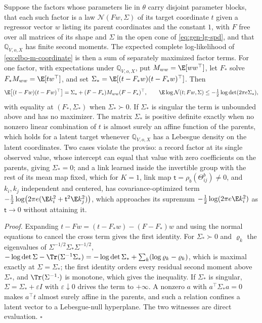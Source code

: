 Suppose the factors whose parameters lie in \(\theta\) carry disjoint
parameter blocks, that each such factor is a law \(\mathcal N(Fw,\Sigma)\) of
its target coordinate \(t\) given a regressor vector \(w\) listing its parent
coordinates and the constant \(1\), with \(F\) free over all matrices of its
shape and \(\Sigma\) in the open cone of \eqref{eq:gen-lg-spd}, and that
\(\mathbb Q_{V,o,X}\) has finite second moments. The expected complete
log-likelihood of \eqref{eq:elbo-m-coordinate} is then a sum of separately
maximized factor terms. For one factor, with expectations under
\(\mathbb Q_{V,o,X}\), put \(M_{ww}=\E[ww^\top]\), let \(F_*\) solve
\(F_*M_{ww}=\E[tw^\top]\), and set \(\Sigma_*=\E[(t-F_*w)(t-F_*w)^\top]\). Then
\begin{equation}
\E\bigl[(t-Fw)(t-Fw)^\top\bigr]=\Sigma_*+(F-F_*)M_{ww}(F-F_*)^\top,
\qquad
\E\log\mathcal N(t;Fw,\Sigma)\leq-\tfrac12\log\det(2\pi e\Sigma_*),
\label{eq:elbo-gaussian-m-step}
\end{equation}
with equality at \((F_*,\Sigma_*)\) when \(\Sigma_*\succ0\). If \(\Sigma_*\) is
singular the term is unbounded above and has no maximizer. The matrix
\(\Sigma_*\) is positive definite exactly when no nonzero linear combination of
\(t\) is almost surely an affine function of the parents, which holds for a
latent target whenever \(\mathbb Q_{V,o,X}\) has a Lebesgue density on the
latent coordinates. Two cases violate the proviso: a record factor at its
single observed value, whose intercept can equal that value with zero
coefficients on the parents, giving \(\Sigma_*=0\); and a link learned inside
the invertible group with the rest of its mean map fixed, which for \(K=1\),
link map \(\mathsf t=\rho_b(\Theta^b_{ij})\neq0\), and \(k_i,k_j\) independent
and centered, has covariance-optimized term
\(-\tfrac12\log\bigl(2\pi e(\E k_i^2+\mathsf t^2\E k_j^2)\bigr)\), which
approaches its supremum \(-\tfrac12\log(2\pi e\E k_i^2)\) as
\(\mathsf t\to0\) without attaining it. 

\noindent\emph{Proof.}
Expanding \(t-Fw=(t-F_*w)-(F-F_*)w\) and using the normal equations to cancel
the cross term gives the first identity. For \(\Sigma_*\succ0\) and
\(\varrho_k\) the eigenvalues of \(\Sigma^{-1/2}\Sigma_*\Sigma^{-1/2}\),
\(-\log\det\Sigma-\Tr(\Sigma^{-1}\Sigma_*)
=-\log\det\Sigma_*+\sum_k(\log\varrho_k-\varrho_k)\), which is maximal exactly
at \(\Sigma=\Sigma_*\); the first identity orders every residual second moment
above \(\Sigma_*\), and \(\Tr(\Sigma^{-1}\cdot)\) is monotone, which gives the
inequality. If \(\Sigma_*\) is singular, \(\Sigma=\Sigma_*+\varepsilon I\) with
\(\varepsilon\downarrow0\) drives the term to \(+\infty\). A nonzero \(a\) with
\(a^\top\Sigma_*a=0\) makes \(a^\top t\) almost surely affine in the parents,
and such a relation confines a latent vector to a Lebesgue-null hyperplane.
The two witnesses are direct evaluation. \(\square\)

